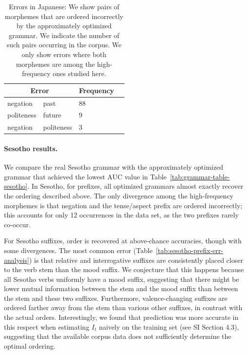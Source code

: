 \begin{table}
    \centering
    \begin{tabular}{ll|ll}
    \multicolumn{2}{c|}{Error} & Frequency \\ \hline\hline
negation & past & 88 \\
politeness & future & 9 \\
negation & politeness & 3 \\
\end{tabular}
    \caption{Errors in Japanese: We show pairs of morphemes that are ordered incorrectly by the approximately optimized grammar.
    We indicate the number of such pairs occurring in the corpus.
    We only show errors where both morphemes are among the high-frequency ones studied here.
    }
    \label{tab:jap-err-analysis}
\end{table}

\paragraph{Sesotho results.} We compare the real Sesotho grammar with the approximately optimized grammar that achieved the lowest AUC value in Table~\ref{tab:grammar-table-sesotho}.  In Sesotho, for prefixes, all optimized grammars almost exactly recover the ordering described above.
The only divergence among the high-frequency morphemes is that negation and the tense/aspect prefix are ordered incorrectly; this accounts for only 12 occurrences in the data set, as the two prefixes rarely co-occur.

For Sesotho suffixes, order is recovered at above-chance accuracies, though with some divergences.
The most common error (Table~\ref{tab:sesotho-prefix-err-analysis}) is that relative and interrogative suffixes are consistently placed closer to the verb stem than the mood suffix.
We conjecture that this happens because all Sesotho verbs uniformly have a mood suffix, suggesting that there might be lower mutual information between the stem and the mood suffix than between the stem and these two suffixes.
Furthermore, valence-changing suffixes are ordered farther away from the stem than various other suffixes, in contrast with the actual orders.
Interestingly, we found that prediction was more accurate in this respect when estimating $I_t$ naively  on the training set (see SI Section 4.3), suggesting that the available corpus data does not sufficiently determine the optimal ordering.



